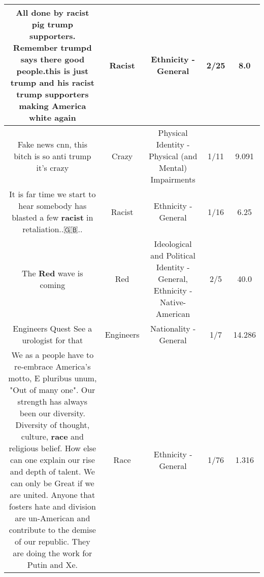 \documentclass[11pt]{article}
\newlength\mylength
\begin{document}
\begin{center}
\begin{longtable}{|C{.65\mylength}|C{.30\mylength}|C{.12\mylength}|C{.12\mylength}|C{.12\mylength}|}
  \small All done by \textbf{racist} pig trump supporters. Remember trumpd says there good people.this is just trump and his \textbf{racist} trump supporters making America white again\normalsize   & Racist & Ethnicity - General & 2/25 & 8.0 \\  \hline
  \small Fake news cnn, this bitch is so anti trump it's crazy\normalsize   & Crazy & Physical Identity - Physical (and Mental) Impairments & 1/11 & 9.091 \\  \hline
  \small It is far time we start to hear somebody has blasted a few \textbf{racist} in retaliation..🇬🇧..\normalsize   & Racist & Ethnicity - General & 1/16 & 6.25 \\  \hline
  \small The \textbf{R\textbf{ed}} wave is coming\normalsize   & Red &  Ideological and Political Identity - General, Ethnicity - Native-American & 2/5 & 40.0 \\  \hline
  \small Engineers Quest See a urologist for that\normalsize   & Engineers & Nationality - General & 1/7 & 14.286 \\  \hline
  \small We as a people have to re-embrace America's motto, E pluribus unum, "Out of many one". Our strength has always been our diversity. Diversity of thought, culture, \textbf{race} and religious belief. How else can one explain our rise and depth of talent. We can only be Great if we are united. Anyone that fosters hate and division are un-American and contribute to the demise of our republic. They are doing the work for Putin and Xe.\normalsize   & Race & Ethnicity - General & 1/76 & 1.316 \\  \hline

\end{longtable}
\end{center}
\end{document}
